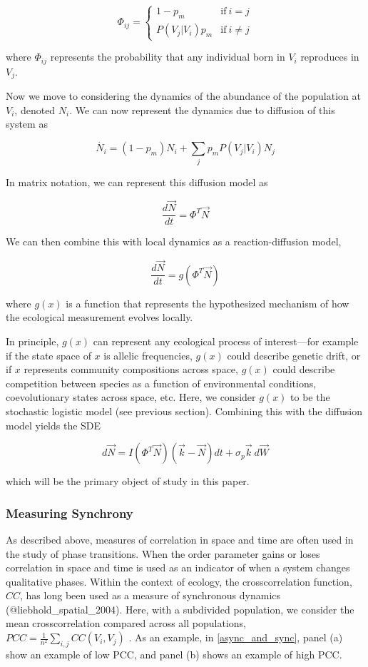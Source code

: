 \documentclass[]{article}
\begin{document}
\[\Phi_{ij} = \begin{cases} 1 - p_m \quad\quad &\text{if}\ i = j \\ P(V_j|V_i)p_m & \text{if}\ i \neq j\end{cases}\]

where \(\Phi_{ij}\) represents the probability that any individual born
in \(V_i\) reproduces in \(V_j\).

Now we move to considering the dynamics of the abundance of the
population at \(V_i\), denoted \(N_i\). We can now represent the
dynamics due to diffusion of this system as

\[\dot{N_i}=(1-p_m)N_i+ \sum_j p_mP(V_j|V_i)N_j\]

In matrix notation, we can represent this diffusion model as

\[\frac{d\vec{N}}{dt}=\Phi^T\vec{N}\]

We can then combine this with local dynamics as a reaction-diffusion
model,

\[\frac{d\vec{N}}{dt} = g(\Phi^T \vec{N})\]

where \(g(x)\) is a function that represents the hypothesized mechanism
of how the ecological measurement evolves locally.

In principle, \(g(x)\) can represent any ecological process of
interest---for example if the state space of \(x\) is allelic
frequencies, \(g(x)\) could describe genetic drift, or if \(x\)
represents community compositions across space, \(g(x)\) could describe
competition between species as a function of environmental conditions,
coevolutionary states across space, etc. Here, we consider \(g(x)\) to
be the stochastic logistic model (see previous section). Combining this
with the diffusion model yields the SDE

\begin{equation} \label{diffusion_model}
  d \vec{N} = {I} (\Phi^T \vec{N})(\vec{k}-\vec{N}) dt + \sigma_p \vec{k} \ d\vec{W}
\end{equation}

which will be the primary object of study in this paper.

\hypertarget{measuring-synchrony}{%
\subsubsection{Measuring Synchrony}\label{measuring-synchrony}}

As described above, measures of correlation in space and time are often
used in the study of phase transitions. When the order parameter gains
or loses correlation in space and time is used as an indicator of when a
system changes qualitative phases. Within the context of ecology, the
crosscorrelation function, \(CC\), has long been used as a measure of
synchronous dynamics (@liebhold\_spatial\_2004). Here, with a subdivided
population, we consider the mean crosscorrelation compared across all
populations, \({PCC}=\frac{1}{n^2}\sum_{i,j} CC(V_i,V_j)\) . As an
example, in \ref{async_and_sync}, panel (a) show an example of low PCC,
and panel (b) shows an example of high PCC.
\end{document}
